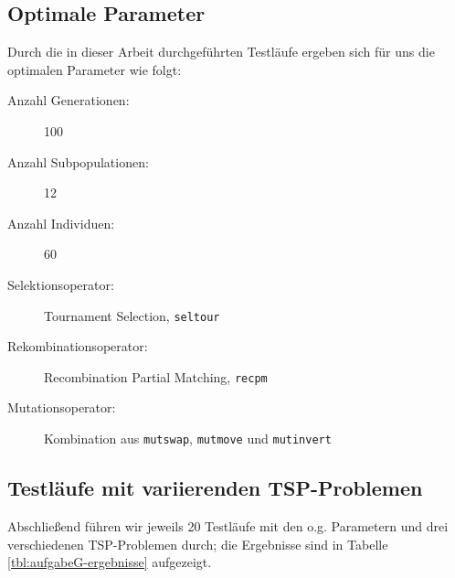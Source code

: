 \subsection{Optimale Parameter}
Durch die in dieser Arbeit durchgeführten Testläufe ergeben sich für uns die
optimalen Parameter wie folgt:

\begin{description}
  \item[Anzahl Generationen:] 100
  \item[Anzahl Subpopulationen:] 12
  \item[Anzahl Individuen:] 60
  \item[Selektionsoperator:] Tournament Selection, \texttt{seltour}
  \item[Rekombinationsoperator:] Recombination Partial Matching, \texttt{recpm}
  \item[Mutationsoperator:] Kombination aus \texttt{mutswap}, \texttt{mutmove} 
	und \texttt{mutinvert}
\end{description}

\subsection{Testläufe mit variierenden TSP-Problemen}
Abschließend führen wir jeweils 20 Testläufe mit den o.g. Parametern und drei
verschiedenen TSP-Problemen durch; die Ergebnisse sind in Tabelle
\ref{tbl:aufgabeG-ergebnisse} aufgezeigt.

